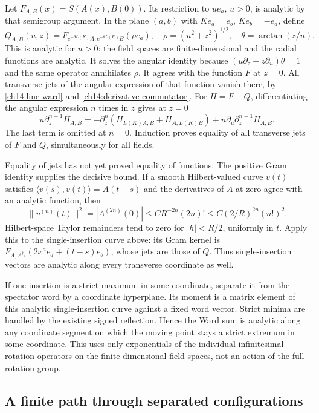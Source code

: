 Let $F_{A,B}(x)=S(A(x),B(0))$. Its restriction to $ue_a$, $u>0$,
is analytic by that semigroup argument. In the plane $(a,b)$ with
$Ke_a=e_b$, $Ke_b=-e_a$, define
\[
 Q_{A,B}(u,z)=F_{e^{-\theta L(K)}A,e^{-\theta L(K)}B}(\rho e_a),
 \quad \rho=(u^2+z^2)^{1/2},\quad\theta=\arctan(z/u).
\]
This is analytic for $u>0$: the field spaces are finite-dimensional
and the radial functions are analytic. It solves the angular
identity because
$(u\partial_z-z\partial_u)\theta=1$ and the same operator annihilates
$\rho$. It agrees with the function $F$ at $z=0$.
All transverse jets of the angular expression of that function vanish there,
by \eqref{ch14:line-ward} and
\eqref{ch14:derivative-commutator}. For $H=F-Q$, differentiating
the angular expression $n$ times in $z$ gives at $z=0$
\[
 u\partial_z^{n+1}H_{A,B}
 =-\partial_z^n(H_{L(K)A,B}+H_{A,L(K)B})
                        +n\partial_u\partial_z^{n-1}H_{A,B}.
\]
The last term is omitted at $n=0$. Induction proves equality of all
transverse jets of $F$ and $Q$, simultaneously for all fields.

Equality of jets has not yet proved equality of functions. The
positive Gram identity supplies the decisive bound. If a smooth
Hilbert-valued curve $v(t)$ satisfies
$\langle v(s),v(t)\rangle=A(t-s)$ and the derivatives of $A$ at
zero agree with an analytic function, then
\[
 \|v^{(n)}(t)\|^2=|A^{(2n)}(0)|
 \le C R^{-2n}(2n)!
 \le C(2/R)^{2n}(n!)^2.
\]
Hilbert-space Taylor remainders tend to zero for $|h|<R/2$,
uniformly in $t$. Apply this to the single-insertion curve above: its Gram
kernel is $F_{A,A^{\dagger_a}}(2x^ae_a+(t-s)e_b)$, whose jets
are those of $Q$. Thus single-insertion vectors are analytic along every
transverse coordinate as well.

If one insertion is a strict maximum in some coordinate, separate
it from the spectator word by a coordinate hyperplane. Its moment
is a matrix element of this analytic single-insertion curve against a
fixed word vector. Strict minima are handled by the existing signed
reflection. Hence the Ward sum is analytic along any coordinate
segment on which the moving point stays a strict extremum in some
coordinate. This uses only exponentials of the individual infinitesimal rotation operators on the finite-dimensional field spaces, not an action of the full
rotation group.

\subsection{A finite path through separated configurations}


